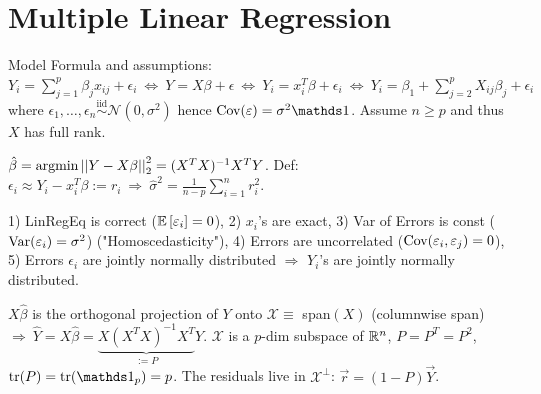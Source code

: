 \section{Multiple Linear Regression}

Model Formula and assumptions: $Y_i = \sum_{j=1}^p \beta_j x_{ij} + \epsilon_i \ \Leftrightarrow \ Y = X \beta + \epsilon \ \Leftrightarrow \ Y_i = x_i^T \beta + \epsilon_i \ \Leftrightarrow \ Y_i = \beta_1 + \sum_{j=2}^p X_{ij} \beta_j + \epsilon_i$ where $\epsilon_1,\dots,\epsilon_n \stackrel{\text{iid}}{\sim} \mathcal{N}(0,\sigma^2)$ hence $\Cov(\epsilon) = \sigma^2 \id$. Assume $n \geq p$ and thus $X$ has full rank.

\vspace{4pt}

$\hat{\beta} = \text{argmin} \left\vert\left\vert Y - X \beta \right\vert\right\vert_2^2 = (X^T X)^{-1} X^T Y$. Def: $\epsilon_i \approx Y_i - x_i^T \beta := r_i \ \Rightarrow \ \hat{\sigma}^2 = \frac{1}{n-p} \sum_{i=1}^n r_i^2$.

\vspace{4pt}

 1) LinRegEq is correct ($\mathbb{E} \left[ \varepsilon_i \right] = 0$), 2) $x_i$'s are exact, 3) Var of Errors is const ($\text{Var}(\varepsilon_i) = \sigma^2$) ("Homoscedasticity"), 4) Errors are uncorrelated ($\text{Cov}(\varepsilon_i,\varepsilon_j) = 0$), 5) Errors $\epsilon_i$ are jointly normally distributed $\Rightarrow$ $Y_i$'s are jointly normally distributed.

\vspace{4pt}

$X \hat{\beta}$ is the orthogonal projection of $Y$ onto $\mathcal{X} \equiv$ span$(X)$ (columnwise span) $\Rightarrow \ \hat{Y} = X \hat{\beta} = \underbrace{X (X^T X)^{-1} X^T}_{:= P} Y$. $\mathcal{X}$ is a $p$-dim subspace of $\mathbb{R}^n$, $P = P^T = P^2$, $\tr(P) = \tr(\id_p) = p$. The residuals live in $\mathcal{X}^\perp$: $\vec{r} = (1-P) \vec{Y}$.


\vspace{-5pt}

